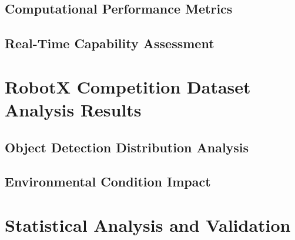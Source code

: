 \documentclass{erauthesis}
\begin{document}

\subsection{Computational Performance Metrics}

\subsection{Real-Time Capability Assessment}

\section{RobotX Competition Dataset Analysis Results}


\subsection{Object Detection Distribution Analysis}

\subsection{Environmental Condition Impact}

\section{Statistical Analysis and Validation}

\end{document}
